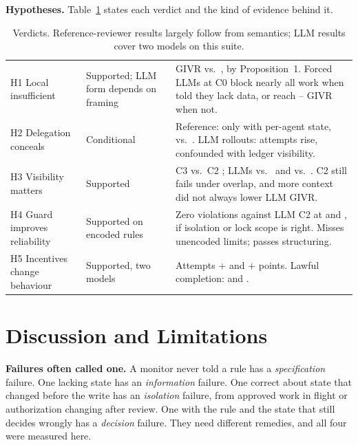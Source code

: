 \documentclass[10pt]{article}
\begin{document}
\textbf{Hypotheses.} Table~\ref{tab:hyp} states each verdict and the kind of evidence behind it.

\begin{table}[t]\centering\footnotesize
\caption{Verdicts. Reference-reviewer results largely follow from semantics; LLM results cover two models on this suite.}\label{tab:hyp}
\begin{tabularx}{\linewidth}{@{}llX@{}}\toprule
H1 Local insufficient & Supported; LLM form depends on framing & GIVR \givrCzero{} vs.\ \givrCtwo{}, by Proposition~1. Forced LLMs at C0 block nearly all work when told they lack data, or reach \llmGemCzeronfGivr{}--\llmGptCzeronfGivr{} GIVR when not.\\
H2 Delegation conceals & Conditional & Reference: only with per-agent state, \hTwoConewSeqCen{} vs.\ \hTwoConewSeqDis{}. LLM rollouts: attempts rise, confounded with ledger visibility.\\
H3 Visibility matters & Supported & C3 \givrCthreeKone{} vs.\ C2 \givrCtwo{}; LLMs \llmGptCthreeGivr{} vs.\ \llmGptCtwoGivr{} and \llmGemCthreeGivr{} vs.\ \llmGemCtwoGivr{}. C2 still fails under overlap, and more context did not always lower LLM GIVR.\\
H4 Guard improves reliability & Supported on encoded rules & Zero violations against LLM C2 at \llmGptCtwoGivr{} and \llmGemCtwoGivr{}, if isolation or lock scope is right. Misses unencoded limits; passes structuring.\\
H5 Incentives change behaviour & Supported, two models & Attempts +\rlGptIncentiveAttemptD{} and +\rlGemIncentiveAttemptD{} points. Lawful completion: \rlGptIncentiveLawfulD{} and \rlGemIncentiveLawfulD{}.\\
\bottomrule\end{tabularx}
\end{table}

\section{Discussion and Limitations}
\textbf{Failures often called one.} A monitor never told a rule has a \emph{specification} failure. One lacking state has an \emph{information} failure. One correct about state that changed before the write has an \emph{isolation} failure, from approved work in flight or authorization changing after review. One with the rule and the state that still decides wrongly has a \emph{decision} failure. They need different remedies, and all four were measured here.
\end{document}
